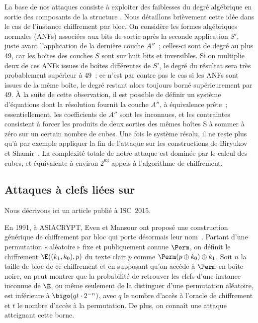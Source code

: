 La base de nos attaques consiste à exploiter des faiblesses du degré algébrique en sortie des composants de la structure \asasa. Nous détaillons brièvement cette idée dans le cas de l'instance
chiffrement par bloc. On considère les formes algébriques normales (ANFs) associées aux bits de sortie après la seconde application $S'$,
juste avant l'application de la dernière couche $A''$~;
celles-ci sont de degré au plus 49, car les boîtes des couches $S$ sont sur huit bits et inversibles. Si on multiplie deux de ces ANFs issues de boîtes différentes de $S'$, le degré du résultat
sera très probablement supérieur à 49~; ce n'est par contre pas le cas si les ANFs sont issues de la même boîte, le degré restant alors toujours borné supérieurement par 49.
À la suite de cette observation, il est possible de définir un système d'équations dont la résolution fournit la couche $A''$, à équivalence prête~;
essentiellement,
les coefficients de $A''$ sont les inconnues, et les contraintes consistent à forcer les produits de deux sorties des mêmes boîtes S à sommer à zéro sur un certain nombre de cubes. Une fois le système résolu, il ne reste plus qu'à par exemple
appliquer la fin de l'attaque sur les constructions \sasas de Biryukov et Shamir~\cite{DBLP:conf/eurocrypt/BiryukovS01}. La complexité totale de notre attaque est dominée par le calcul
des cubes, et équivalente à environ $2^{63}$ appels à l'algorithme de chiffrement.

\subsection{Attaques à clefs liées sur \proestotr \cite{DBLP:conf/isw/Karpman15}}

Nous décrivons ici un article publié à ISC~2015.

\medskip

En 1991, à ASIACRYPT, Even et Mansour ont proposé une construction générique de chiffrement par bloc qui porte désormais leur nom~\cite{EM}. Partant d'une permutation «\,aléatoire\,» fixe
et publiquement connue $\Perm$, on définit le chiffrement $\E((k_1,k_0),p)$ du texte clair $p$ comme $\Perm(p \oplus k_0) \oplus k_1$. Soit $n$ la taille de bloc
de ce chiffrement
et en supposant qu'on accède à $\Perm$ en boîte noire, on peut montrer que la probabilité de retrouver les clefs d'une instance inconnue de $\E$,
ou même seulement de la distinguer d'une permutation aléatoire, est inférieure à
$\bigo(qt \cdot 2^{-n})$, avec $q$ le nombre d'accès à l'oracle de chiffrement et $t$ le nombre d'accès à la permutation. De plus, on connaît une attaque atteignant cette borne.

